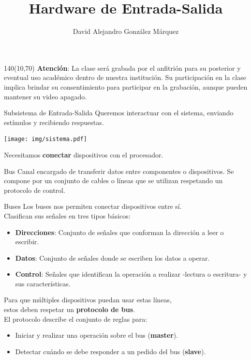 \documentclass[aspectratio=169]{beamer}
\title{\Huge Hardware de Entrada-Salida}
\author{David Alejandro González Márquez}
\date{}
\begin{document}
\begin{frame}[plain]
    \titlepage
    \begin{textblock}{140}(10,70)
    \textcolor{rojo}{
    \textbf{Atención}: La clase será grabada por el anfitrión para su posterior y eventual uso académico dentro de nuestra institución. Su participación en la clase implica brindar su consentimiento para participar en la grabación, aunque pueden mantener su video apagado.}
    \end{textblock}
\end{frame}

\begin{frame}[fragile]{Subsistema de Entrada-Salida}
    Queremos interactuar con el sistema, enviando estímulos y recibiendo respuestas.
    \begin{center} \texttt{[image: img/sistema.pdf]} \end{center}
    \begin{center}
    \textcolor{verdeuca}{Necesitamos \textbf{conectar} dispositivos con el procesador.}
    \end{center}
    \pause
    \vspace{-0.3cm}
    \begin{block}{\Large Bus}
    Canal encargado de transferir datos entre componentes o dispositivos. 
    Se compone por un conjunto de cables o líneas que se utilizan respetando un protocolo de control.
    \end{block}
\end{frame}

\begin{frame}[fragile]{Buses}
    Los buses nos permiten conectar dispositivos entre sí.\\
    \bigskip
    Clasifican sus señales en tres tipos básicos:
    \begin{itemize}
    \item \textbf{Direcciones}: Conjunto de señales que conforman la dirección a leer o escribir.
    \item \textbf{Datos}: Conjunto de señales donde se escriben los datos a operar.
    \item \textbf{Control}: Señales que identifican la operación a realizar -lectura o escritura- y sus características.
    \end{itemize}
    \pause
    Para que múltiples dispositivos puedan usar estas líneas,\\ estos deben respetar un \textbf{protocolo de bus}.\\
    \bigskip
    El protocolo describe el conjunto de reglas para:
    \begin{itemize}
    \item Iniciar y realizar una operación sobre el bus (\textbf{master}).
    \item Detectar cuándo se debe responder a un pedido del bus (\textbf{slave}).
    \end{itemize}
\end{frame}
\end{document}
